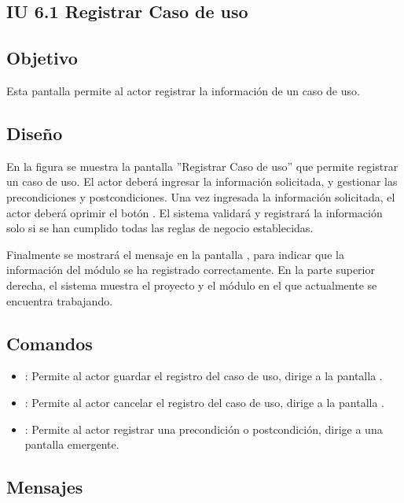 \subsection{IU 6.1 Registrar Caso de uso}

\subsection{Objetivo}
	Esta pantalla permite al actor registrar la información de un caso de uso.
\subsection{Diseño}
	En la figura  se muestra la pantalla ''Registrar Caso de uso'' que permite registrar un caso de
	uso. El actor deberá ingresar la información solicitada, y gestionar las precondiciones y postcondiciones.
	Una vez ingresada la información solicitada, el actor deberá oprimir el botón  . El sistema validará y registrará la información solo si se han cumplido todas las reglas de negocio establecidas.
	
	Finalmente se mostrará el mensaje  en la pantalla , para indicar que la información del módulo se ha registrado correctamente.
	En la parte superior derecha, el sistema muestra el proyecto y el módulo en el que actualmente se encuentra trabajando.

\subsection{Comandos}
\begin{itemize}
	\item {}: Permite al actor guardar el registro del caso de uso, dirige a la pantalla .
	\item {}: Permite al actor cancelar el registro del caso de uso, dirige a la pantalla .
	\item {}: Permite al actor registrar una precondición o postcondición, dirige a una pantalla emergente.
\end{itemize}

\subsection{Mensajes}

